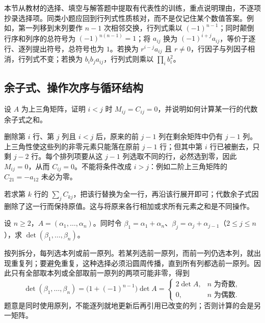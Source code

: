 本节从教材的选择、填空与解答题中提取有代表性的训练，重点说明理由，不逐项抄录选择项。同类小题应回到行列式性质核对，而不是仅记住某个数值答案。例如，第一列移到末列要作 $n-1$ 次相邻交换，行列式乘以 $(-1)^{n-1}$；同时颠倒行序和列序的总符号为 $(-1)^{n(n-1)}=1$；将 $a_{ij}$ 换为 $(-1)^{i+j}a_{ij}$，等价于逐行、逐列提出符号，总符号也为 $1$。若换为 $r^{i-j}a_{ij}$ 且 $r\ne0$，行因子与列因子相消，行列式不变；若换为 $b_ib_ja_{ij}$，行列式则乘以 $\prod_i b_i^2$。

\subsection{余子式、操作次序与循环结构}

\begin{example}
\label{ex:xie-ex-det-triangular-cofactors}
设 $A$ 为上三角矩阵，证明 $i<j$ 时 $M_{ij}=C_{ij}=0$，并说明如何计算某一行的代数余子式之和。
\end{example}

\begin{solve}
删除第 $i$ 行、第 $j$ 列且 $i<j$ 后，原来的前 $j-1$ 列在剩余矩阵中仍有 $j-1$ 列。上三角性使这些列的非零元素只能落在原前 $j-1$ 行；但其中第 $i$ 行已被删去，只剩 $j-2$ 行。每个排列项要从这 $j-1$ 列选取不同的行，必然选到零，因此 $M_{ij}=0$，从而 $C_{ij}=0$。不能将条件改成 $i>j$：例如二阶上三角矩阵的 $C_{21}=-a_{12}$ 未必为零。

若求第 $k$ 行的 $\sum_j C_{kj}$，把该行替换为全一行，再沿该行展开即可；代数余子式因删除了这一行而保持原值。这与将原来各行相加或求所有元素之和是不同操作。
\end{solve}

\begin{example}
\label{ex:xie-ex-det-cyclic-column-addition}
设 $n\geq2$，$A=(\alpha_1,\ldots,\alpha_n)$。同时令 $\beta_1=\alpha_1+\alpha_n$、$\beta_j=\alpha_j+\alpha_{j-1}$（$2\leq j\leq n$），求 $\det(\beta_1,\ldots,\beta_n)$。
\end{example}

\begin{solve}
按列拆分，每列选本列或前一原列。若某列选前一原列，而前一列仍选本列，就出现重复列；要避免重复，这种选择必须沿圆周传播，直到所有列都选前一原列。因此只有全部取本列或全部取前一原列的两项可能非零，得到
\[
\det(\beta_1,\ldots,\beta_n)
=\bigl(1+(-1)^{n-1}\bigr)\det A
=\begin{cases}2\det A,&n\text{ 为奇数},\\0,&n\text{ 为偶数}.\end{cases}
\]
题意是同时使用原列，不能逐列就地更新后再引用已改变的列；否则计算的会是另一矩阵。
\end{solve}

